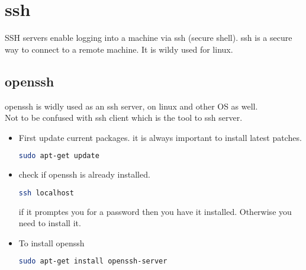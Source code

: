 \documentclass{book}
\begin{document}
\section{ssh}
SSH servers enable logging into a machine via ssh (secure shell). ssh is a secure way to connect to a remote machine. It is wildy used for linux.\\

\subsection{openssh}
openssh is widly used as an ssh server, on linux and other OS as well.\\
Not to be confused with ssh client which is the tool to ssh server.\\
\begin{itemize}
\item First update current packages. it is always important to install latest patches.
\begin{lstlisting}[language=bash]
sudo apt-get update
\end{lstlisting}
\item check if openssh is already installed.
\begin{lstlisting}[language=bash]
ssh localhost
\end{lstlisting}
if it promptes you for a password then you have it installed. Otherwise you need to install it.\\
\item To install openssh
\begin{lstlisting}[language=bash]
sudo apt-get install openssh-server
\end{lstlisting}

\end{itemize}
\end{document}
